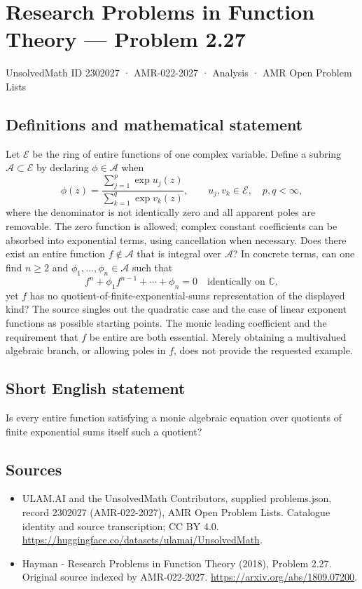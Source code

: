 \documentclass[11pt,a4paper]{article}
\begin{document}
\section*{Research Problems in Function Theory — Problem 2.27}\label{2302027}
{\small UnsolvedMath ID 2302027 · AMR-022-2027 · Analysis · AMR Open Problem Lists}
\subsection{Definitions and mathematical statement}
Let $\mathcal E$ be the ring of entire functions of one complex variable. Define a subring $\mathcal A\subset\mathcal E$ by declaring $\phi\in\mathcal A$ when
\[
\phi(z)=\frac{\sum_{j=1}^{p}\exp u_j(z)}{\sum_{k=1}^{q}\exp v_k(z)},
\qquad u_j,v_k\in\mathcal E,\quad p,q<\infty,
\]
where the denominator is not identically zero and all apparent poles are removable. The zero function is allowed; complex constant coefficients can be absorbed into exponential terms, using cancellation when necessary.
Does there exist an entire function $f\notin\mathcal A$ that is integral over $\mathcal A$? In concrete terms, can one find $n\ge2$ and $\phi_1,\ldots,\phi_n\in\mathcal A$ such that
\[
f^n+\phi_1f^{n-1}+\cdots+\phi_n=0
\quad\text{identically on }\mathbb C,
\]
yet $f$ has no quotient-of-finite-exponential-sums representation of the displayed kind?
The source singles out the quadratic case and the case of linear exponent functions as possible starting points. The monic leading coefficient and the requirement that $f$ be entire are both essential. Merely obtaining a multivalued algebraic branch, or allowing poles in $f$, does not provide the requested example.
\subsection{Short English statement}
Is every entire function satisfying a monic algebraic equation over quotients of finite exponential sums itself such a quotient?
\subsection{Sources}
\begin{itemize}
\item[S1] ULAM.AI and the UnsolvedMath Contributors, supplied problems.json, record 2302027 (AMR-022-2027), AMR Open Problem Lists. Catalogue identity and source transcription; CC BY 4.0.
\url{https://huggingface.co/datasets/ulamai/UnsolvedMath}.
\item[S2] Hayman - Research Problems in Function Theory (2018), Problem 2.27. Original source indexed by AMR-022-2027.
\url{https://arxiv.org/abs/1809.07200}.
\end{itemize}
\end{document}
